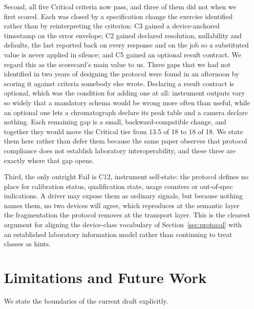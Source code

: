 \documentclass[11pt]{article}
\begin{document}
Second, all five Critical criteria now pass, and three of them did not when we first
scored. Each was closed by a specification change the exercise identified rather than by
reinterpreting the criterion: C3 gained a device-anchored timestamp on the error envelope;
C2 gained declared resolution, nullability and defaults, the last reported back on every
response and on the job so a substituted value is never applied in silence; and C5 gained an
optional result contract. We regard this as the scorecard's main value to us. Three gaps that
we had not identified in two years of designing the protocol were found in an afternoon by
scoring it against criteria somebody else wrote. Declaring a result contract is optional, which was
the condition for adding one at all: instrument outputs vary so widely that a mandatory
schema would be wrong more often than useful, while an optional one lets a chromatograph
declare its peak table and a camera declare nothing. Each remaining gap is a small,
backward-compatible change, and together they would move the Critical tier from 13.5 of 18 to
18 of 18. We state them here rather than defer them because the same paper observes that
protocol compliance does not establish laboratory interoperability, and these three are
exactly where that gap opens.

Third, the only outright Fail is C12, instrument self-state: the protocol defines no place
for calibration status, qualification state, usage counters or out-of-spec indications. A
driver may expose them as ordinary signals, but because nothing names them, no two devices
will agree, which reproduces at the semantic layer the fragmentation the protocol removes at
the transport layer. This is the clearest argument for aligning the device-class vocabulary
of Section~\ref{sec:protocol} with an established laboratory information model rather than
continuing to treat classes as hints.



\section{Limitations and Future Work}
\label{sec:limitations}

We state the boundaries of the current draft explicitly.
\end{document}

